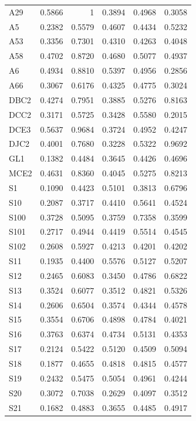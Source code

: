 \begin{longtable}{lrrrrr}
  A29 & 0.5866 & 1 & 0.3894 & 0.4968 & 0.3058 \\
  A5 & 0.2382 & 0.5579 & 0.4607 & 0.4434 & 0.5232 \\
  A53 & 0.3356 & 0.7301 & 0.4310 & 0.4263 & 0.4048 \\
  A58 & 0.4702 & 0.8720 & 0.4680 & 0.5077 & 0.4937 \\
  A6 & 0.4934 & 0.8810 & 0.5397 & 0.4956 & 0.2856 \\
  A66 & 0.3067 & 0.6176 & 0.4325 & 0.4775 & 0.3024 \\
  DBC2 & 0.4274 & 0.7951 & 0.3885 & 0.5276 & 0.8163 \\
  DCC2 & 0.3171 & 0.5725 & 0.3428 & 0.5580 & 0.2015 \\
  DCE3 & 0.5637 & 0.9684 & 0.3724 & 0.4952 & 0.4247 \\
  DJC2 & 0.4001 & 0.7680 & 0.3228 & 0.5322 & 0.9692 \\
  GL1 & 0.1382 & 0.4484 & 0.3645 & 0.4426 & 0.4696 \\
  MCE2 & 0.4631 & 0.8360 & 0.4045 & 0.5275 & 0.8213 \\
  S1 & 0.1090 & 0.4423 & 0.5101 & 0.3813 & 0.6796 \\
  S10 & 0.2087 & 0.3717 & 0.4410 & 0.5641 & 0.4524 \\
  S100 & 0.3728 & 0.5095 & 0.3759 & 0.7358 & 0.3599 \\
  S101 & 0.2717 & 0.4944 & 0.4419 & 0.5514 & 0.4545 \\
  S102 & 0.2608 & 0.5927 & 0.4213 & 0.4201 & 0.4202 \\
  S11 & 0.1935 & 0.4400 & 0.5576 & 0.5127 & 0.5207 \\
  S12 & 0.2465 & 0.6083 & 0.3450 & 0.4786 & 0.6822 \\
  S13 & 0.3524 & 0.6077 & 0.3512 & 0.4821 & 0.5326 \\
  S14 & 0.2606 & 0.6504 & 0.3574 & 0.4344 & 0.4578 \\
  S15 & 0.3554 & 0.6706 & 0.4898 & 0.4784 & 0.4021 \\
  S16 & 0.3763 & 0.6374 & 0.4734 & 0.5131 & 0.4353 \\
  S17 & 0.2124 & 0.5422 & 0.5120 & 0.4509 & 0.5094 \\
  S18 & 0.1877 & 0.4655 & 0.4818 & 0.4815 & 0.4577 \\
  S19 & 0.2432 & 0.5475 & 0.5054 & 0.4961 & 0.4244 \\
  S20 & 0.3072 & 0.7038 & 0.2629 & 0.4097 & 0.3512 \\
  S21 & 0.1682 & 0.4883 & 0.3655 & 0.4485 & 0.4917 \\

\end{longtable}
